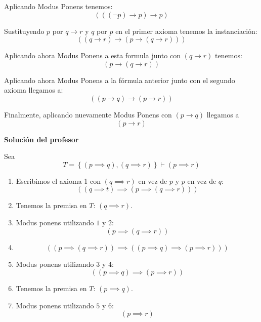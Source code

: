 \begin{problem}[1]
Aplicando Modus Ponens tenemos:
\[ ( ((\neg p) \to p) \to p)\]

\spart
Sustituyendo $p$ por $q \to r$ y $q$ por $p$ en el primer axioma tenemos la instanciación:
\[((q \to r) \to (p \to (q \to r)))\]

Aplicando ahora Modus Ponens a esta formula junto con $(q \to r)$ tenemos:
\[(p \to (q \to r))\]

Aplicando ahora Modus Ponens a la fórmula anterior junto con el segundo axioma llegamos a:
\[ ( (p\to q) \to (p\to r))\]

Finalmente, aplicando nuevamente Modus Ponens con $(p \to q)$ llegamos a
\[(p \to r )\]

\textbf{Solución del profesor}

Sea $$T=\left\{(p\implies q), (q\implies r)\right\}\vdash(p\implies r)$$

\begin{enumerate}
	\item Escribimos el axioma 1 con $(q\implies r)$ en vez de $p$ y $p$ en vez de $q$:
	$$((q\implies t)\implies(p\implies (q\implies r)))$$
	\item Tenemos la premisa en $T$: $(q\implies r)$.
	\item Modus ponens utilizando $1$ y $2$:
	$$(p\implies(q\implies r))$$
	\item $$\left((p\implies(q\implies r))\implies ((p\implies q)\implies(p\implies r))\right)$$
	\item Modus ponens utilizando $3$ y $4$: $$((p\implies q) \implies (p\implies r))$$
	\item Tenemos la premisa en $T$:
	$(p\implies q)$.
	\item Modus ponens utilizando $5$ y $6$:
	$$(p\implies r)$$
\end{enumerate}

\end{problem}

